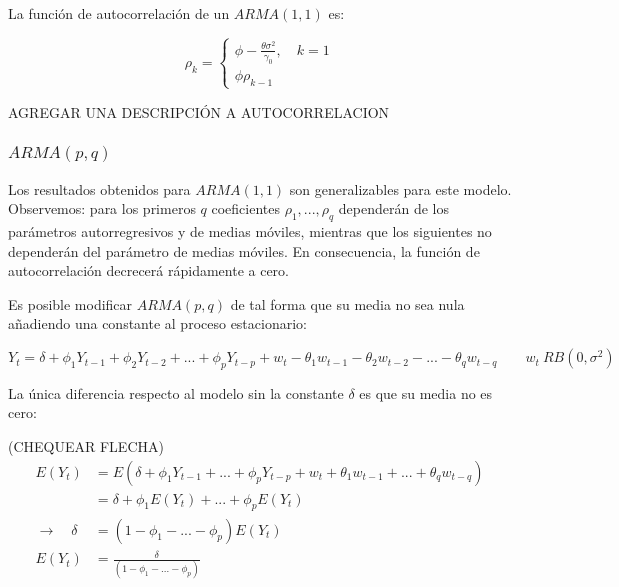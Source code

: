 \documentclass[a4paper,10pt]{article}
\begin{document}
La función de autocorrelación de un $ARMA(1,1)$ es:

\begin{equation*}
\rho_k= \left\{ \begin{array}{lcc}
             \phi - \frac{\theta \sigma^2}{\gamma_0} , \quad k=1 \\
             \phi \rho_{k-1}
             \end{array}
   \right.
\end{equation*}

AGREGAR UNA DESCRIPCIÓN A AUTOCORRELACION

\subsubsection{$ARMA(p,q)$}

Los resultados obtenidos para $ARMA(1,1)$ son generalizables para este modelo. Observemos: para los primeros $q$ coeficientes $\rho_1, ..., \rho_q$ dependerán de los parámetros autorregresivos y de medias móviles, mientras que los siguientes no dependerán del parámetro de medias móviles. En consecuencia, la función de autocorrelación decrecerá rápidamente a cero.

Es posible modificar $ARMA(p,q)$ de tal forma que su media no sea nula añadiendo una constante al proceso estacionario:

\begin{equation}
Y_t = \delta + \phi_1Y_{t-1} + \phi_2Y_{t-2} + ... + \phi_pY_{t-p} + w_t -\theta_1w_{t-1} - \theta_2w_{t-2} - ... - \theta_qw_{t-q} \qquad w_t ~ RB(0,\sigma^2)
\end{equation}

La única diferencia respecto al modelo sin la constante $\delta$ es que su media no es cero:

(CHEQUEAR FLECHA)
\begin{equation*}
\begin{split}
E(Y_t) &= E(\delta + \phi_1 Y_{t-1} +...+ \phi_p Y_{t-p} + w_t + \theta_1 w_{t-1} + ... + \theta_q w_{t-q})\\
& = \delta + \phi_1 E(Y_t) + ... + \phi_p E(Y_{t})\\
\to \quad \delta &= (1-\phi_1-...-\phi_p) E(Y_t) \\
E(Y_t) & = \frac{\delta}{(1-\phi_1-...-\phi_p)}
\end{split}
\end{equation*}
\end{document}
